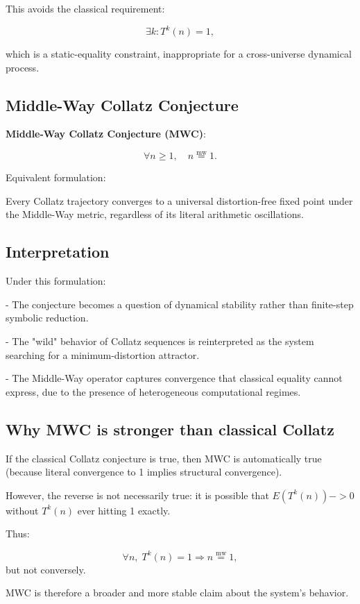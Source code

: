 \documentclass[11pt]{article}
\newcommand{\mweq}{\mathrel{\overset{\mathrm{mw}}{=}}}
\theoremstyle{definition}
\theoremstyle{remark}
\begin{document}
This avoids the classical requirement:

\[
  \exists k : T^k(n) = 1,
\]

which is a static-equality constraint, inappropriate for a
cross-universe dynamical process.

\subsection{Middle-Way Collatz Conjecture}

\textbf{Middle-Way Collatz Conjecture (MWC)}:

\[
  \forall n \ge 1, \quad n \mweq 1.
\]

Equivalent formulation:

Every Collatz trajectory converges to a universal distortion-free fixed
point under the Middle-Way metric, regardless of its literal arithmetic
oscillations.

\subsection{Interpretation}

Under this formulation:

- The conjecture becomes a question of dynamical stability rather than
  finite-step symbolic reduction.

- The "wild" behavior of Collatz sequences is reinterpreted as the
  system searching for a minimum-distortion attractor.

- The Middle-Way operator captures convergence that classical equality
  cannot express, due to the presence of heterogeneous computational
  regimes.

\subsection{Why MWC is stronger than classical Collatz}

If the classical Collatz conjecture is true, then MWC is automatically
true (because literal convergence to 1 implies structural convergence).

However, the reverse is not necessarily true:  
it is possible that $E(T^k(n)) -> 0$ without $T^k(n)$ ever hitting 1
exactly.

Thus:

\[
  \forall n,\; T^k(n) = 1 \Rightarrow n \mweq 1,
\]
but not conversely.

MWC is therefore a broader and more stable claim about the system's
behavior.
\end{document}
